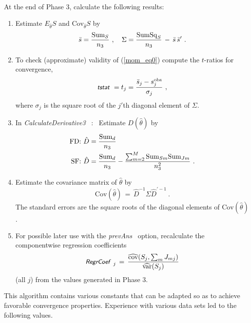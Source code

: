 \documentclass[a4paper,12pt,fleqn]{article}
\newcommand{\Cov}{\mbox{Cov}}
\newcommand{\nnm}[1]{\textsf{\small\textit{#1}\ }}
\begin{document}
\begin{enumerate}
     At the end of Phase 3, calculate the following results:
      \begin{enumerate}
      \item
           Estimate $E_{\hat\theta} S$ and $\Cov_{\hat\theta} S$ by
           \[
           \bar{s} = \frac{{\rm{Sum}}_{S}}{n_3} \ , \hspace{1em}
           \Sigma = \frac{{\rm{SumSq}}_{S}}{n_3} \,-\, \bar{s}\,\bar{s}' \ .
           \]
      \item
           To check (approximate) validity of (\ref{mom_eq0}) compute the
           $t$-ratios for convergence,
           \begin{equation}
           \nnm{tstat} = t_j = \frac{\bar{s}_j - s^{\rm{obs}}_j}{\sigma_j} \ ,
                                \label{tstat}
           \end{equation}
           where $\sigma_j$ is the square root of the $j'$th diagonal element
           of $\Sigma$.
      \item In \nnm{CalculateDerivative3} : \
           Estimate $D(\hat\theta)$ by
      \begin{align*}
      \text{FD:    }   \hat{D} &= \frac{{\rm{Sum}}_{d}}{n_3} \\
      \text{SF:     }  \hat{D} &= \frac{{\rm{Sum}}_{d}}{n_3} -
                         \frac{\sum_{m=2}^M {\rm{Sum}}_{Sm}{\rm{Sum}}_{Jm}}{n_3^2} \ .
      \end{align*}
      \item Estimate the covariance matrix of $\hat\theta$ by
            \begin{equation}
            \Cov (\hat\theta) \,=\,  {\hat D}^{-1}  \Sigma {\hat D }^{' -1} \ .
                      \label{eq:cov}
            \end{equation}
            The standard errors are the square roots of the diagonal elements
            of $\Cov (\hat\theta)$.
      \item For possible later use with the \nnm{prevAns} option, recalculate the
            componentwise regression coefficients
            \[
            \nnm{RegrCoef}_j \,=\, \frac{\widehat{\text{cov}}(S_j, \sum_m J_{mj})}
                                   {\widehat{\text{var}}(S_j)}
            \]
            (all $j$) from the values generated in Phase 3.
      \end{enumerate}

\end{enumerate}


This algorithm contains various constants that can be adapted so as to achieve
favorable convergence properties.
Experience with various data sets led to the following values.
\end{document}
